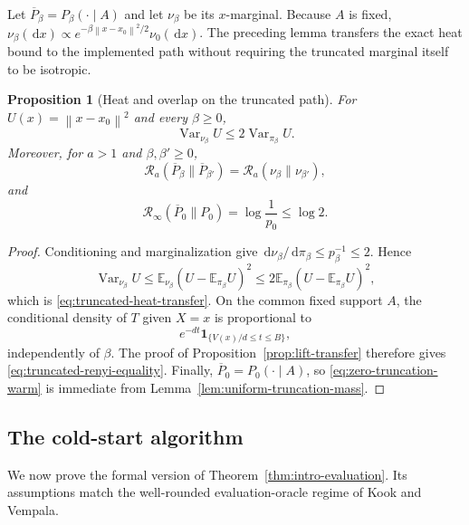 \documentclass[11pt]{article}
\newtheorem{proposition}[theorem]{Proposition}
\theoremstyle{remark}
\newcommand{\E}{\mathbb E}
\newcommand{\1}{\bm 1}
\newcommand{\Var}{\operatorname{Var}}
\newcommand{\dd}{\,\mathrm d}
\newcommand{\norm}[1]{\left\lVert #1\right\rVert}
\begin{document}
Let $\overline P_\beta=P_\beta(\cdot\mid A)$ and let $\nu_\beta$ be its
$x$-marginal.  Because $A$ is fixed,
$\nu_\beta(\dd x)\propto e^{-\beta\norm{x-x_0}^2/2}\nu_0(\dd x)$.
The preceding lemma transfers the exact heat bound to the implemented
path without requiring the truncated marginal itself to be isotropic.

\begin{proposition}[Heat and overlap on the truncated path]
\label{prop:truncated-path-transfer}
For $U(x)=\norm{x-x_0}^2$ and every $\beta\geq0$,
\begin{equation}\label{eq:truncated-heat-transfer}
  \Var_{\nu_\beta}U
  \leq2\Var_{\pi_\beta}U.
\end{equation}
Moreover, for $a>1$ and $\beta,\beta'\geq0$,
\begin{equation}\label{eq:truncated-renyi-equality}
  \mathcal R_a(\overline P_\beta\|\overline P_{\beta'})
  =\mathcal R_a(\nu_\beta\|\nu_{\beta'}),
\end{equation}
and
\begin{equation}\label{eq:zero-truncation-warm}
  \mathcal R_\infty(\overline P_0\|P_0)
  =\log\frac1{p_0}\leq\log2.
\end{equation}
\end{proposition}

\begin{proof}
Conditioning and marginalization give
$\dd\nu_\beta/\dd\pi_\beta\leq p_\beta^{-1}\leq2$.  Hence
\[
  \Var_{\nu_\beta}U
  \leq\E_{\nu_\beta}(U-\E_{\pi_\beta}U)^2
  \leq2\E_{\pi_\beta}(U-\E_{\pi_\beta}U)^2,
\]
which is \eqref{eq:truncated-heat-transfer}.  On the common fixed
support $A$, the conditional density of $T$ given $X=x$ is proportional
to
\[
  e^{-dt}\1_{\{V(x)/d\leq t\leq B\}},
\]
independently of $\beta$.  The proof of
Proposition~\ref{prop:lift-transfer} therefore gives
\eqref{eq:truncated-renyi-equality}.  Finally,
$\overline P_0=P_0(\cdot\mid A)$, so
\eqref{eq:zero-truncation-warm} is immediate from
Lemma~\ref{lem:uniform-truncation-mass}.
\end{proof}

\subsection{The cold-start algorithm}

We now prove the formal version of
Theorem~\ref{thm:intro-evaluation}.  Its assumptions match the
well-rounded evaluation-oracle regime of Kook and Vempala.
\end{document}
